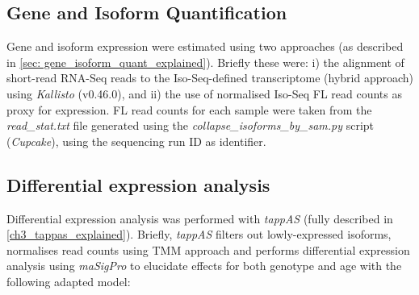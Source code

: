 \subsection{Gene and Isoform Quantification}
Gene and isoform expression were estimated using two approaches (as described in \cref{sec: gene_isoform_quant_explained}). Briefly these were: i) the alignment of short-read RNA-Seq reads to the Iso-Seq-defined transcriptome (hybrid approach) using \textit{Kallisto}\cite{Bray2016} (v0.46.0), and ii) the use of normalised Iso-Seq FL read counts as proxy for expression. FL read counts for each sample were taken from the \textit{read\_stat.txt} file generated using the \textit{collapse\_isoforms\_by\_sam.py} script (\textit{Cupcake}), using the sequencing run ID as identifier. 

\subsection{Differential expression analysis}
Differential expression analysis was performed with \textit{tappAS} (fully described in \cref{ch3_tappas_explained}). Briefly, \textit{tappAS} filters out lowly-expressed isoforms, normalises read counts using TMM approach and performs differential expression analysis using \textit{maSigPro}\cite{Conesa2006,Nueda2014,Conesa2017} to elucidate effects for both genotype and age with the following adapted model\cite{Conesa2006}: 

